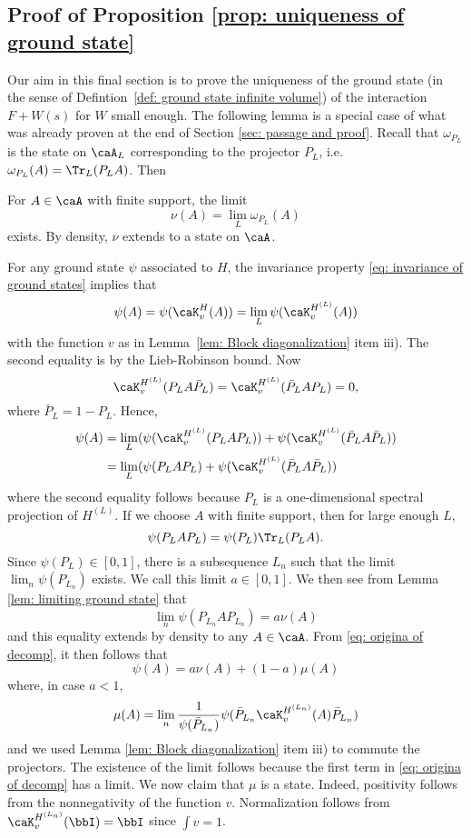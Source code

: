 \subsection{Proof of Proposition \ref{prop: uniqueness of ground state}}

Our aim in this final section is to prove the uniqueness of the ground state (in the sense of Defintion~\ref{def: ground state infinite volume}) of the interaction $F + W(s)$ for $W$ small enough. The following lemma is a special case of what was already proven at the end of Section \ref{sec: passage and proof}. Recall that $\omega_{P_L}$ is the state on $\caA_L$ corresponding to the projector $P_L$, i.e.\ $\omega_{P_L}(A)=\Tr_{L}(P_L A)$. Then
\begin{lemma}\label{lem: limiting ground state} 
	For $A\in \caA$ with finite support, the limit
	$$
	\nu(A)=\lim_L \omega_{P_L}(A)
	$$
	exists. By density, $\nu$ extends to a state on $\caA$.
\end{lemma}




For any ground state $\psi$ associated to $H$, the invariance property \eqref{eq: invariance of ground states} implies that
$$
\psi(A)=  \psi(\caK_v^H(A)) = \lim_L \psi(\caK_v^{H^{(L)}}(A))
$$
with the function $v$ as in Lemma~\ref{lem: Block diagonalization} item iii). The second equality is by the Lieb-Robinson bound. Now
$$
\caK_v^{H^{(L)}}({P_L}A\bar{P}_L)= \caK_v^{H^{(L)}}(\bar{P}_L A{P_L})=0,
$$
where $\bar{P}_L = 1-P_L$. Hence,
\begin{align}
	\psi(A) &=  \lim_L ( \psi(\caK_v^{H^{(L)}}(P_LAP_L)) +  \psi(\caK_v^{H^{(L)}}(\bar P_L A\bar P_L)) \\
	&=  \lim_L ( \psi(P_LAP_L) +  \psi(\caK_v^{H^{(L)}}(\bar P_L A\bar P_L))  \label{eq: origina of decomp}
\end{align}
where the second equality follows because $P_L$ is a one-dimensional spectral projection of $H^{(L)}$. 
If we choose $A$ with finite support, then for large enough $L$, 
$$
\psi(P_LAP_L)= \psi(P_L) \Tr_L(P_LA).
$$
Since $\psi(P_L) \in [0,1]$, there is a subsequence $L_n$ such that the limit $\lim_n\psi(P_{L_n})$ exists. We call this limit $a \in [0,1]$.
We then see from Lemma \ref{lem: limiting ground state} that
$$
\lim_n \psi(P_{L_n}AP_{L_n}) = a \nu(A)
$$
and this equality extends by density to any $A\in \caA$. 
From \eqref{eq: origina of decomp}, it then follows that 
\begin{equation}\label{eq: convex decomposition}
	\psi(A)= a \nu(A) +(1-a)\mu(A)
\end{equation}
where, in case $ a < 1$,  
$$
\mu(A)=\lim_n    \frac{1}{\psi(\bar{P}_{L_n})}  \psi(\bar{P}_{L_n}\caK_v^{H^{(L_n)}}(A)\bar{P}_{L_n})
$$
and we used Lemma \ref{lem: Block diagonalization} item iii) to commute the projectors. The existence of the limit follows because the first term in \eqref{eq: origina of decomp} has a limit.  
We now claim that $\mu$ is a state. Indeed, positivity follows from the nonnegativity of the function $v$. Normalization follows from $\caK_v^{H^{(L_n)}}(\bbI) = \bbI$ since $\int v = 1$. 

